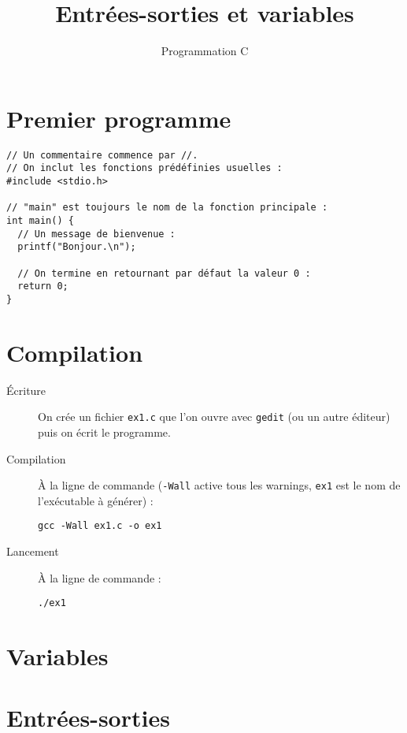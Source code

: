\documentclass[a4paper,11pt]{article}
\begin{document}
  \title{Entrées-sorties et variables}
  \author{Programmation C}
  \date{}
  \maketitle
  
  \section{Premier programme}
  \begin{verbatim}
// Un commentaire commence par //.
// On inclut les fonctions prédéfinies usuelles :
#include <stdio.h>

// "main" est toujours le nom de la fonction principale :
int main() {
  // Un message de bienvenue :
  printf("Bonjour.\n");
  
  // On termine en retournant par défaut la valeur 0 :
  return 0;
}
  \end{verbatim}
  
  \section{Compilation}
  \begin{description}
    \item[Écriture] On crée un fichier \texttt{ex1.c} que l'on ouvre avec \texttt{gedit} (ou un autre éditeur) puis on écrit le programme.
    \item[Compilation] À la ligne de commande (\texttt{-Wall} active tous les warnings, \texttt{ex1} est le nom de l'exécutable à générer) :
      \begin{verbatim}
gcc -Wall ex1.c -o ex1
      \end{verbatim}
    \item[Lancement] À la ligne de commande :
      \begin{verbatim}
./ex1
      \end{verbatim}
  \end{description}
  
  \section{Variables}
  
  \section{Entrées-sorties}
\end{document}
